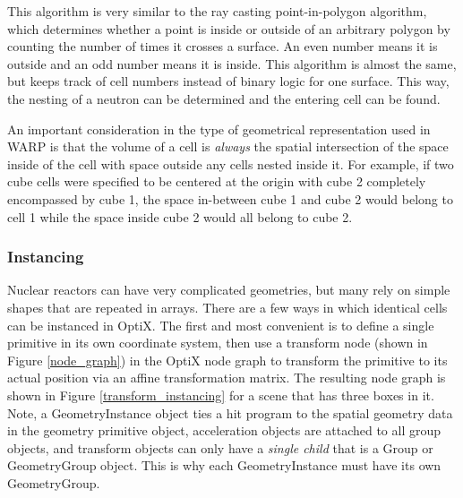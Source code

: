 This algorithm is very similar to the ray casting point-in-polygon algorithm, which determines whether a point is inside or outside of an arbitrary polygon by counting the number of times it crosses a surface.  An even number means it is outside and an odd number means it is inside.  This algorithm is almost the same, but keeps track of cell numbers instead of binary logic for one surface.  This way, the nesting of a neutron can be determined and the entering cell can be found.  


An important consideration in the type of geometrical representation used in WARP is that the volume of a cell is \emph{always} the spatial intersection of the space inside of the cell with space outside any cells nested inside it.  For example, if two cube cells were specified to be centered at the origin with cube 2 completely encompassed by cube 1, the space in-between cube 1 and cube 2 would belong to cell 1 while the space inside cube 2 would all belong to cube 2.

\subsubsection{Instancing}

Nuclear reactors can have very complicated geometries, but many rely on simple shapes that are repeated in arrays.  There are a few ways in which identical cells can be instanced in OptiX.  The first and most convenient is to define a single primitive in its own coordinate system, then use a transform node (shown in Figure \ref{node_graph}) in the OptiX node graph to transform the primitive to its actual position via an affine transformation matrix.  The resulting node graph is shown in Figure \ref{transform_instancing} for a scene that has three boxes in it.  Note, a GeometryInstance object ties a hit program to the spatial geometry data in the geometry primitive object, acceleration objects are attached to all group objects, and transform objects can only have a \emph{single child} that is a Group or GeometryGroup object.  This is why each GeometryInstance must have its own GeometryGroup.


